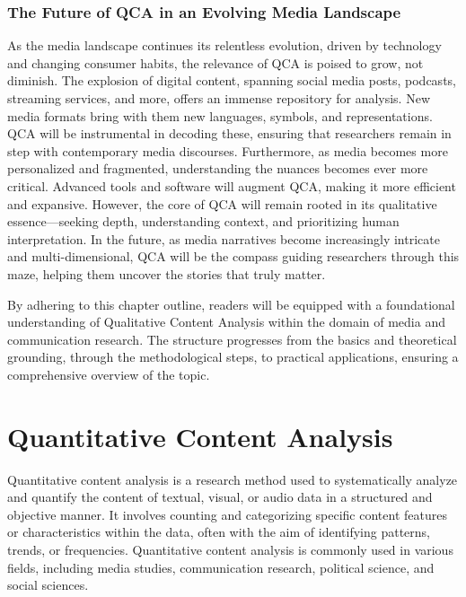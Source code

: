 \documentclass[
  b5paper]{book}
\begin{document}
\hypertarget{the-future-of-qca-in-an-evolving-media-landscape}{%
\subsection*{The Future of QCA in an Evolving Media Landscape}\label{the-future-of-qca-in-an-evolving-media-landscape}}

As the media landscape continues its relentless evolution, driven by technology and changing consumer habits, the relevance of QCA is poised to grow, not diminish. The explosion of digital content, spanning social media posts, podcasts, streaming services, and more, offers an immense repository for analysis. New media formats bring with them new languages, symbols, and representations. QCA will be instrumental in decoding these, ensuring that researchers remain in step with contemporary media discourses. Furthermore, as media becomes more personalized and fragmented, understanding the nuances becomes ever more critical. Advanced tools and software will augment QCA, making it more efficient and expansive. However, the core of QCA will remain rooted in its qualitative essence---seeking depth, understanding context, and prioritizing human interpretation. In the future, as media narratives become increasingly intricate and multi-dimensional, QCA will be the compass guiding researchers through this maze, helping them uncover the stories that truly matter.

By adhering to this chapter outline, readers will be equipped with a foundational understanding of Qualitative Content Analysis within the domain of media and communication research. The structure progresses from the basics and theoretical grounding, through the methodological steps, to practical applications, ensuring a comprehensive overview of the topic.

\hypertarget{quantitative-content-analysis-1}{%
\chapter{Quantitative Content Analysis}\label{quantitative-content-analysis-1}}

Quantitative content analysis is a research method used to systematically analyze and quantify the content of textual, visual, or audio data in a structured and objective manner. It involves counting and categorizing specific content features or characteristics within the data, often with the aim of identifying patterns, trends, or frequencies. Quantitative content analysis is commonly used in various fields, including media studies, communication research, political science, and social sciences.
\end{document}
